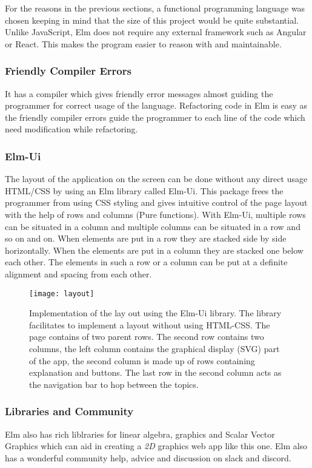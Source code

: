 For the reasons in the previous sections, a functional programming language was
chosen keeping in mind that the size of this project would be quite
substantial.  Unlike JavaScript, Elm does not require any external framework
such as Angular or React. This makes the program easier to reason with and
maintainable.

\subsubsection{Friendly Compiler Errors}
It has a compiler which gives friendly error messages almost guiding the
programmer for correct usage of the language. Refactoring code in Elm is easy
as the friendly compiler errors guide the programmer to each line of the code
which need modification while refactoring.

\subsubsection{Elm-Ui}
The layout of the application on the screen can be done without any direct
usage HTML/CSS by using an Elm library called Elm-Ui. This package frees the
programmer from using CSS styling and gives intuitive control of the page
layout with the help of rows and columns (Pure functions). With Elm-Ui,
multiple rows can be situated in a column and multiple columns can be situated
in a row and so on and on. When elements are put in a row they are stacked side
by side horizontally. When the elements are put in a column they are stacked
one below each other. The elements in such a row or a column can be put at a
definite alignment and spacing from each other.

\begin{figure}[!ht]
\centering
\texttt{[image: layout]}
\caption{
         Implementation of the lay out using the Elm-Ui library. The library facilitates
         to implement a layout without using HTML-CSS. The page contains of two parent
         rows. The second row contains two columns, the left column contains
         the graphical display (SVG) part of the app, the second column is made up of
         rows containing explanation and buttons. The last row in the second column
         acts as the navigation bar to hop between the topics.
        }
\end{figure}

\subsubsection{Libraries and Community}
Elm also has rich liblraries for linear algebra, graphics and Scalar Vector
Graphics which can aid in creating a \emph{2D} graphics web app like this one.
Elm also has a wonderful community help, advice and discussion on slack and
discord.

